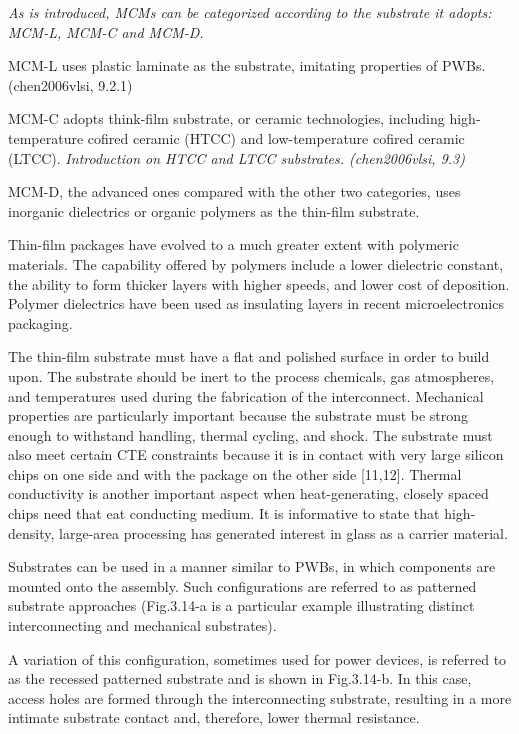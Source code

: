 \begin{spacing}{1.5}
\textit{As is introduced, MCMs can be categorized according to the substrate it adopts: MCM-L, MCM-C and MCM-D. }

MCM-L uses plastic laminate as the substrate, imitating properties of PWBs. (chen2006vlsi, 9.2.1)

MCM-C adopts think-film substrate, or ceramic technologies, including high-temperature cofired ceramic (HTCC) and low-temperature cofired ceramic (LTCC). \textit{Introduction on HTCC and LTCC substrates. (chen2006vlsi, 9.3)}

MCM-D, the advanced ones compared with the other two categories, uses inorganic dielectrics or organic polymers as the thin-film substrate. 

Thin-film packages have evolved to a much greater extent with polymeric materials. The capability offered by polymers include a lower dielectric constant, the ability to form thicker layers with higher speeds, and lower cost of deposition. Polymer dielectrics have been used as insulating layers in recent microelectronics packaging.

The thin-film substrate must have a flat and polished surface in order to build upon. The substrate should be inert to the process chemicals, gas atmospheres, and temperatures used during the fabrication of the interconnect. Mechanical properties are particularly important because the substrate must be strong enough to withstand handling, thermal cycling, and shock. The substrate must also meet certain CTE constraints because it is in contact with very large silicon chips on one side and with the package on the other side [11,12]. Thermal conductivity is another important aspect when heat-generating, closely spaced chips need that  eat conducting medium. It is informative to state that high-density, large-area processing has generated interest in glass as a carrier material. 

Substrates can be used in a manner similar to PWBs, in which components are mounted onto the assembly. Such configurations are referred to as patterned substrate approaches (Fig.3.14-a is a particular example illustrating distinct interconnecting and mechanical substrates).

A variation of this configuration, sometimes used for power devices, is referred to as the recessed patterned substrate and is shown in Fig.3.14-b. In this case, access holes are formed through the interconnecting substrate, resulting in a more intimate substrate contact and, therefore, lower thermal resistance.


\end{spacing}
